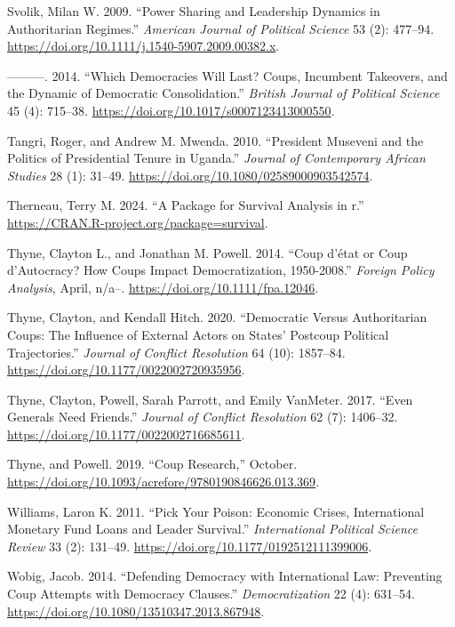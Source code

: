 \documentclass[
  12pt,
]{report}
\newlength{\cslhangindent}
\newenvironment{CSLReferences}[2] %
 {\begin{list}{}{%
  \setlength{\itemindent}{0pt}
  \setlength{\leftmargin}{0pt}
  \setlength{\parsep}{0pt}
  \ifodd #1
   \setlength{\leftmargin}{\cslhangindent}
   \setlength{\itemindent}{-1\cslhangindent}
  \fi
  \setlength{\itemsep}{#2\baselineskip}}}
 {\end{list}}
\begin{document}
\begin{CSLReferences}{1}{0}
Svolik, Milan W. 2009. {``Power Sharing and Leadership Dynamics in
Authoritarian Regimes.''} \emph{American Journal of Political Science}
53 (2): 477--94. \url{https://doi.org/10.1111/j.1540-5907.2009.00382.x}.

---------. 2014. {``Which Democracies Will Last? Coups, Incumbent
Takeovers, and the Dynamic of Democratic Consolidation.''} \emph{British
Journal of Political Science} 45 (4): 715--38.
\url{https://doi.org/10.1017/s0007123413000550}.

Tangri, Roger, and Andrew M. Mwenda. 2010. {``President Museveni and the
Politics of Presidential Tenure in Uganda.''} \emph{Journal of
Contemporary African Studies} 28 (1): 31--49.
\url{https://doi.org/10.1080/02589000903542574}.

Therneau, Terry M. 2024. {``A Package for Survival Analysis in r.''}
\url{https://CRAN.R-project.org/package=survival}.

Thyne, Clayton L., and Jonathan M. Powell. 2014. {``Coup d{'}état or
Coup d'Autocracy? How Coups Impact Democratization, 1950-2008.''}
\emph{Foreign Policy Analysis}, April, n/a--.
\url{https://doi.org/10.1111/fpa.12046}.

Thyne, Clayton, and Kendall Hitch. 2020. {``Democratic Versus
Authoritarian Coups: The Influence of External Actors on States{'}
Postcoup Political Trajectories.''} \emph{Journal of Conflict
Resolution} 64 (10): 1857--84.
\url{https://doi.org/10.1177/0022002720935956}.

Thyne, Clayton, Powell, Sarah Parrott, and Emily VanMeter. 2017. {``Even
Generals Need Friends.''} \emph{Journal of Conflict Resolution} 62 (7):
1406--32. \url{https://doi.org/10.1177/0022002716685611}.

Thyne, and Powell. 2019. {``Coup Research,''} October.
\url{https://doi.org/10.1093/acrefore/9780190846626.013.369}.

Williams, Laron K. 2011. {``Pick Your Poison: Economic Crises,
International Monetary Fund Loans and Leader Survival.''}
\emph{International Political Science Review} 33 (2): 131--49.
\url{https://doi.org/10.1177/0192512111399006}.

Wobig, Jacob. 2014. {``Defending Democracy with International Law:
Preventing Coup Attempts with Democracy Clauses.''}
\emph{Democratization} 22 (4): 631--54.
\url{https://doi.org/10.1080/13510347.2013.867948}.


\end{CSLReferences}
\end{document}

